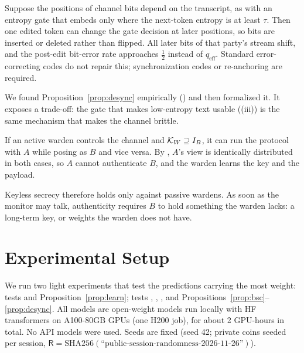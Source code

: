 \begin{proposition}
\label{prop:desync}
Suppose the positions of channel bits depend on the transcript, as with an entropy gate that embeds only where the next-token entropy is at least $\tau$. Then one edited token can change the gate decision at later positions, so bits are inserted or deleted rather than flipped. All later bits of that party's stream shift, and the post-edit bit-error rate approaches $\tfrac12$ instead of $q_{\mathrm{eff}}$. Standard error-correcting codes do not repair this; synchronization codes or re-anchoring are required.
\end{proposition}

We found Proposition~\ref{prop:desync} empirically () and then formalized it. It exposes a trade-off: the gate that makes low-entropy text usable ((iii)) is the same mechanism that makes the channel brittle.

\begin{proposition}
\label{prop:mitm}
If an active warden controls the channel and $\mathcal{K}_W \supseteq I_B$, it can run the protocol with $A$ while posing as $B$ and vice versa. By , $A$'s view is identically distributed in both cases, so $A$ cannot authenticate $B$, and the warden learns the key and the payload.
\end{proposition}

Keyless secrecy therefore holds only against passive wardens. As soon as the monitor may talk, authenticity requires $B$ to hold something the warden lacks: a long-term key, or weights the warden does not have.

\section{Experimental Setup}
\label{sec:setup}

We run two light experiments that test the predictions carrying the most weight: \eone tests  and Proposition~\ref{prop:learn}; \etwo tests , , , and Propositions~\ref{prop:bsc}--\ref{prop:desync}. All models are open-weight models run locally with HF transformers on A100-80GB GPUs (one H200 job), for about 2 GPU-hours in total. No API models were used. Seeds are fixed (\eone seed 42; \etwo private coins seeded per session, $\mathsf{R} = \mathrm{SHA256}(\text{``public-session-randomness-2026-11-26''})$).

